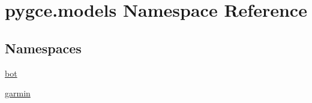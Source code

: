 \hypertarget{namespacepygce_1_1models}{}\section{pygce.\+models Namespace Reference}
\label{namespacepygce_1_1models}
\subsection*{Namespaces}
\begin{DoxyCompactItemize}
\item 
 \hyperlink{namespacepygce_1_1models_1_1bot}{bot}
\item 
 \hyperlink{namespacepygce_1_1models_1_1garmin}{garmin}
\end{DoxyCompactItemize}
